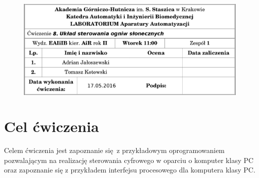\documentclass[a4paper, 12pt]{article}
\begin{document}
	\begin{figure}[H]
		\centering
		\includegraphics[width = \textwidth]{./img/cudo.png}
	\end{figure}
	\section{Cel ćwiczenia}
		Celem ćwiczenia jest zapoznanie się z przykładowym oprogramowaniem pozwalającym na realizację sterowania cyfrowego w oparciu o komputer klasy PC oraz zapoznanie się z przykładem interfejsu procesowego dla komputera klasy PC.
\end{document}
